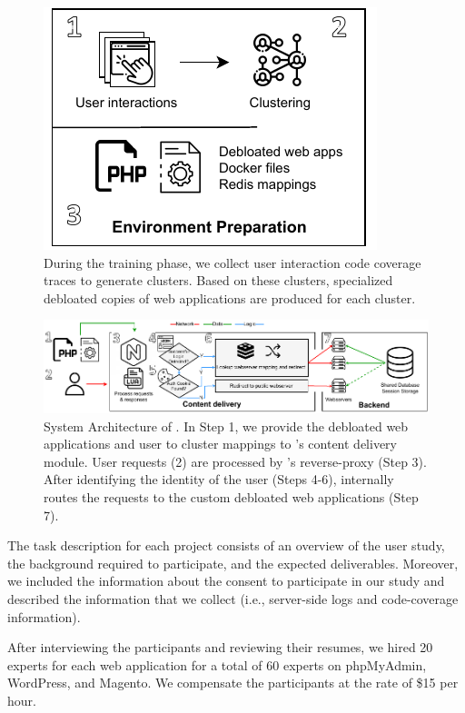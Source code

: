 \begin{figure}[t]
    \centering
    \includegraphics[]{figures/dbltr/EnvironmentPreparation.pdf}
    \caption{During the training phase, we collect user interaction code coverage traces to generate clusters. Based on these clusters, specialized debloated copies of web applications are produced for each cluster.}
    \label{fig:environment_preparation}
\end{figure}

\begin{figure}[h]
    \centering
    \includegraphics[]{figures/dbltr/RoleModelsFlow.pdf}
    \caption{System Architecture of \sys{}. In Step 1, we provide the debloated web applications and user to cluster mappings to \sys{}'s content delivery module. User requests (2) are processed by \sys{}'s reverse-proxy (Step 3). After identifying the identity of the user (Steps 4-6), \sys{} internally routes the requests to the custom debloated web applications (Step 7).}
	\label{fig:system_architecture}
\end{figure}

The task description for each project consists of an overview of the user study, the background required to participate, and the expected deliverables. 
Moreover, we included the information about the consent to participate in our study and described the information that we collect (i.e., server-side logs and code-coverage information). 

After interviewing the participants and reviewing their resumes, we hired 20 experts for each web application for a total of 60 experts on phpMyAdmin, WordPress, and Magento. 
We compensate the participants at the rate of \$15 per hour.

